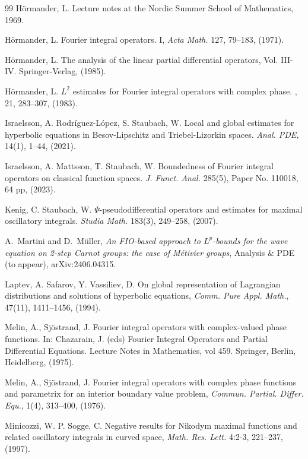 \documentclass[12pt, reqno]{amsart}
\theoremstyle{definition}
\theoremstyle{remark}
\numberwithin{equation}{section}
\begin{document}
\begin{thebibliography}{99}
 H\"ormander, L. Lecture notes at the Nordic Summer School of Mathematics, 1969.

H\"ormander, L. Fourier integral operators. I, {\it Acta Math.} 127, 79--183, (1971).

   H\"ormander, L. { The analysis of the linear partial differential operators,} Vol. III-IV. Springer-Verlag, (1985).

H{\"o}rmander, L.
\newblock  $L^2$ estimates for Fourier integral operators with complex phase.
, 21, 283--307, (1983).

 Israelsson, A. Rodríguez-López, S. Staubach, W. Local and global estimates for hyperbolic equations in Besov-Lipschitz and Triebel-Lizorkin spaces. {\it Anal. PDE,} 14(1), 1--44, (2021).

  Israelsson, A. Mattsson, T. Staubach, W. Boundedness of Fourier integral operators on classical function spaces. {\it J. Funct. Anal.} 285(5), Paper No. 110018, 64 pp, (2023).

  Kenig, C. Staubach, W. $\Psi$-pseudodifferential operators and estimates for maximal oscillatory integrals. {\it Studia Math.} 183(3), 249--258, (2007). 

A.~Martini and D.~M{\"u}ller,
\emph{An FIO-based approach to $L^p$-bounds for the wave equation on 2-step Carnot groups: the case of Métivier groups},
Analysis $\&$ PDE (to appear), arXiv:2406.04315.

  Laptev, A. Safarov, Y.  Vassiliev, D. On global representation of Lagrangian distributions
and solutions of hyperbolic equations, {\it Comm. Pure Appl. Math.}, 47(11), 1411--1456, (1994).

 Melin, A., Sj\"ostrand, J.  Fourier integral operators with complex-valued phase functions. In: Chazarain, J. (eds) Fourier Integral Operators and Partial Differential Equations. Lecture Notes in Mathematics, vol 459. Springer, Berlin, Heidelberg, (1975).

 Melin, A., Sj\"ostrand, J.  Fourier integral operators with complex phase functions and parametrix for an interior boundary value problem, {\it Commun. Partial. Differ. Equ.}, 1(4), 313--400,  (1976).

 Minicozzi, W. P. Sogge, C. Negative results for Nikodym maximal functions and related oscillatory integrals in curved space, {\it Math. Res. Lett.} 4:2-3, 221--237, (1997).


\end{thebibliography}
\end{document}
